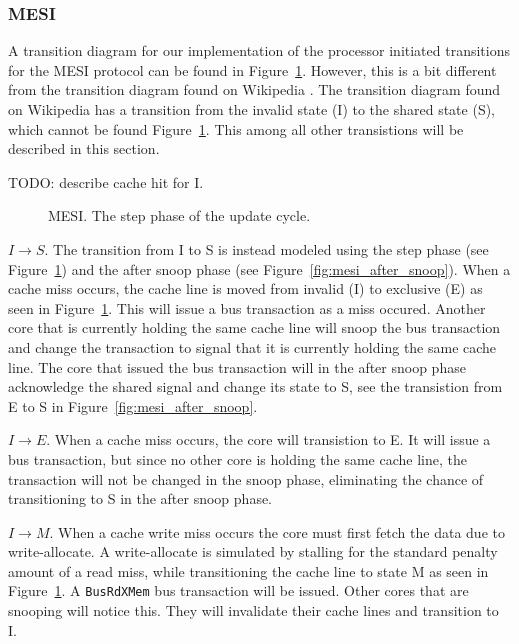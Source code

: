 \subsubsection{MESI}

A transition diagram for our implementation of the processor initiated transitions for the MESI protocol can be found in Figure~\ref{fig:mesi}.
However, this is a bit different from the transition diagram found on Wikipedia \cite{mesi_wiki}.
The transition diagram found on Wikipedia has a transition from the invalid state (I) to the shared state (S), which cannot be found Figure~\ref{fig:mesi}.
This among all other transistions will be described in this section.

TODO: describe cache hit for I.


\begin{figure}[H]
    \centering
    \caption{MESI. The step phase of the update cycle.}
    \label{fig:mesi}
\end{figure}

$I \to S$.
The transition from I to S is instead modeled using the step phase (see Figure~\ref{fig:mesi}) and the after snoop phase (see Figure~\ref{fig:mesi_after_snoop}).
When a cache miss occurs, the cache line is moved from invalid (I) to exclusive (E) as seen in Figure~\ref{fig:mesi}.
This will issue a bus transaction as a miss occured.
Another core that is currently holding the same cache line will snoop the bus transaction and change the transaction to signal that it is currently holding the same cache line.
The core that issued the bus transaction will in the after snoop phase acknowledge the shared signal and change its state to S, see the transistion from E to S in Figure~\ref{fig:mesi_after_snoop}.

$I \to E$.
When a cache miss occurs, the core will transistion to E.
It will issue a bus transaction, but since no other core is holding the same cache line, the transaction will not be changed in the snoop phase, eliminating the chance of transitioning to S in the after snoop phase.

$I \to M$.
When a cache write miss occurs the core must first fetch the data due to write-allocate.
A write-allocate is simulated by stalling for the standard penalty amount of a read miss, while transitioning the cache line to state M as seen in Figure~\ref{fig:mesi}.
A \texttt{BusRdXMem} bus transaction will be issued.
Other cores that are snooping will notice this.
They will invalidate their cache lines and transition to I.

